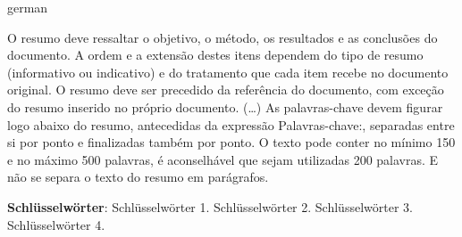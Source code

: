 

\begin{resumo}[Zusammenfassung]
\begin{otherlanguage*}{german}

O resumo deve ressaltar o objetivo, o método, os resultados e as conclusões do documento. A ordem e a extensão destes itens dependem do tipo de resumo (informativo ou indicativo) e do tratamento que cada item recebe no documento original. O resumo deve ser precedido da referência do documento, com exceção do resumo inserido no próprio documento. (\ldots) As palavras-chave devem figurar logo abaixo do resumo, antecedidas da expressão Palavras-chave:, separadas entre si por ponto e finalizadas também por ponto. O texto pode conter no mínimo 150 e no máximo 500 palavras, é aconselhável que sejam utilizadas 200 palavras. E não se separa o texto do resumo em parágrafos.


\vspace{\onelineskip}
\noindent
\textbf{Schlüsselwörter}:  Schlüsselwörter 1. Schlüsselwörter 2. Schlüsselwörter 3. Schlüsselwörter 4.
\end{otherlanguage*}
\end{resumo}